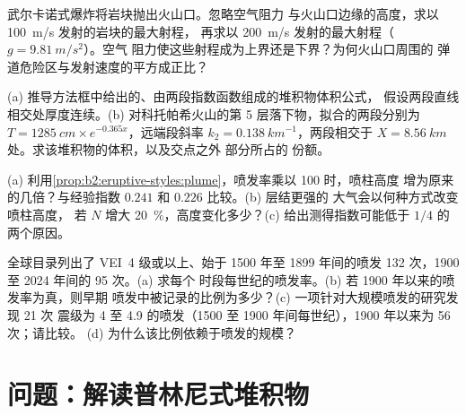 \begin{exercise}[$\star\star$]\label{exo:b2:eruptive-styles:9}
武尔卡诺式爆炸将岩块抛出火山口。忽略空气阻力
与火山口边缘的高度，求以 \qty{100}{m/s} 发射的岩块的最大射程，
再求以 \qty{200}{m/s} 发射的最大射程（$g = \qty{9.81}{m/s^2}$）。空气
阻力使这些射程成为上界还是下界？为何火山口周围的
弹道危险区与发射速度的平方成正比？
\end{exercise}

\begin{exercise}[$\star\star\star$]\label{exo:b2:eruptive-styles:10}
(a) 推导方法框中给出的、由两段指数函数组成的堆积物体积公式，
假设两段直线相交处厚度连续。(b) 对科托帕希火山的第 5 层落下物，拟合的两段分别为 $T = \qty{1285}{cm}\times
e^{-0.365x}$，远端段斜率 $k_2 = \qty{0.138}{km^{-1}}$，两段相交于
$X = \qty{8.56}{km}$ 处。求该堆积物的体积，以及交点之外
部分所占的
份额。
\end{exercise}

\begin{exercise}[$\star\star\star$]\label{exo:b2:eruptive-styles:11}
(a) 利用\cref{prop:b2:eruptive-styles:plume}，喷发率乘以 100 时，喷柱高度
增为原来的几倍？与经验指数 $0.241$ 和 $0.226$ 比较。(b) 层结更强的
大气会以何种方式改变喷柱高度，
若 $N$ 增大
\qty{20}{\percent}，高度变化多少？(c) 给出测得指数可能低于
$1/4$ 的两个原因。
\end{exercise}

\begin{exercise}[$\star\star\star$]\label{exo:b2:eruptive-styles:12}
全球目录列出了 VEI~4 级或以上、始于 1500 年至
1899 年间的喷发 132 次，1900 至 2024 年间的 95 次。(a) 求每个
时段每世纪的喷发率。(b) 若 1900 年以来的喷发率为真，则早期
喷发中被记录的比例为多少？(c) 一项针对大规模喷发的研究发现 21 次
震级为 4 至 4.9 的喷发（1500 至 1900 年间每世纪），1900 年以来为 56 次；请比较。
(d) 为什么该比例依赖于喷发的规模？
\end{exercise}

\section{问题：解读普林尼式堆积物}

